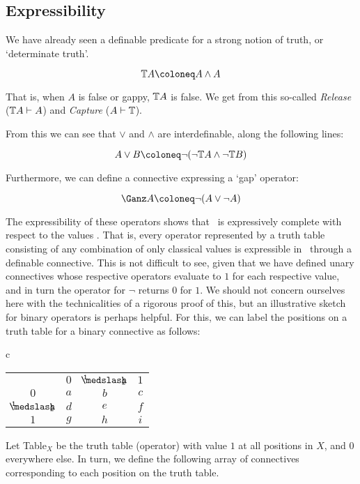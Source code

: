 \subsection{Expressibility}\label{expressibility}

We have already seen a definable predicate for a strong notion of truth, or `determinate truth'.

\[ \Ttrue A \Defined A \wedge A \]

\noindent That is, when $A$ is false or gappy, $\mathbb{T} A$ is false. We get from this so-called \emph{Release} (${\mathbb{T} A}\vdash{A}$) and \emph{Capture} (${A}\vdash{\ensuremath{\mathbb{T}}}$).

From this we can see that $\vee$ and $\wedge$ are interdefinable, along the following lines:

\[ A \vee B \Defined \neg(\neg\Ttrue A \wedge \neg\Ttrue B) \]

\noindent Furthermore, we can define a connective expressing a `gap' operator:

\[ \Gap A \Defined \neg (A \vee \neg A) \]

The expressibility of these operators shows that \GO\ is expressively complete with respect to the values . That is, every operator represented by a truth table consisting of any combination of only classical values is expressible in \GO\ through a definable connective. This is not difficult to see, given that we have defined unary connectives whose respective operators evaluate to $1$ for each respective value, and in turn the operator for $\neg$ returns $0$ for $1$. We should not concern ourselves here with the technicalities of a rigorous proof of this, but an illustrative sketch for binary operators is perhaps helpful. For this, we can label the positions on a truth table for a binary connective as follows:
\begin{singlespace}
\bigskip
\begin{longtable}{c}
	\begin{tabular}{c | c c c}
 		& 				$0$ & 	$\oneHalf$ 	& $1$ \\
		\cline{1-4} 
		$0$ & 			$a$ & 	$b$ 		& $c$ \\
		$\oneHalf$ & 	$d$ & 	$e$ 		& $f$ \\
		$1$ & 			$g$ & 	$h$ 		& $i$ \\
	\end{tabular}
\end{longtable}
\end{singlespace}

\noindent Let \textsf{Table}$_X$ be the truth table (operator) with value $1$ at all positions in $X$, and $0$ everywhere else. In turn, we define the following array of connectives corresponding to each position on the truth table.

